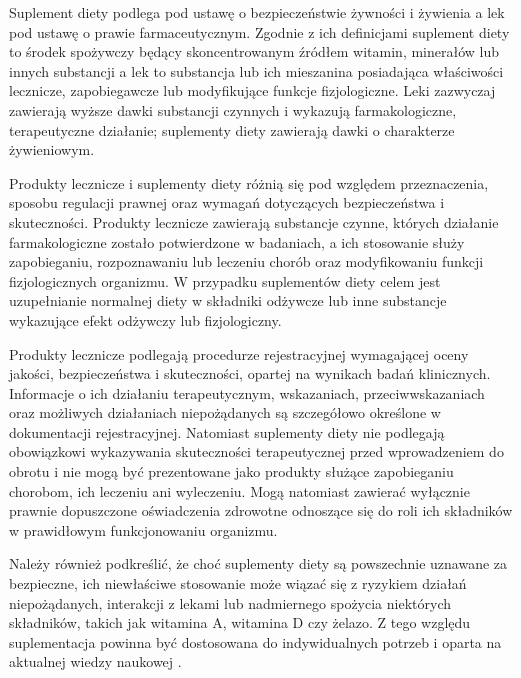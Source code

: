 Suplement diety podlega pod ustawę o bezpieczeństwie żywności i żywienia a lek pod ustawę o prawie farmaceutycznym. Zgodnie z ich definicjami suplement diety to środek spożywczy będący skoncentrowanym źródłem witamin, minerałów lub innych substancji a lek to substancja lub ich mieszanina posiadająca właściwości lecznicze, zapobiegawcze lub modyfikujące funkcje fizjologiczne. Leki zazwyczaj zawierają wyższe dawki substancji czynnych i wykazują farmakologiczne, terapeutyczne działanie; suplementy diety zawierają dawki o charakterze żywieniowym.

Produkty lecznicze i suplementy diety różnią się pod względem przeznaczenia, sposobu regulacji prawnej oraz wymagań dotyczących bezpieczeństwa i skuteczności. Produkty lecznicze zawierają substancje czynne, których działanie farmakologiczne zostało potwierdzone w badaniach, a ich stosowanie służy zapobieganiu, rozpoznawaniu lub leczeniu chorób oraz modyfikowaniu funkcji fizjologicznych organizmu. W przypadku suplementów diety celem jest uzupełnianie normalnej diety w składniki odżywcze lub inne substancje wykazujące efekt odżywczy lub fizjologiczny.

Produkty lecznicze podlegają procedurze rejestracyjnej wymagającej oceny jakości, bezpieczeństwa i skuteczności, opartej na wynikach badań klinicznych. Informacje o ich działaniu terapeutycznym, wskazaniach, przeciwwskazaniach oraz możliwych działaniach niepożądanych są szczegółowo określone w dokumentacji rejestracyjnej. Natomiast suplementy diety nie podlegają obowiązkowi wykazywania skuteczności terapeutycznej przed wprowadzeniem do obrotu i nie mogą być prezentowane jako produkty służące zapobieganiu chorobom, ich leczeniu ani wyleczeniu. Mogą natomiast zawierać wyłącznie prawnie dopuszczone oświadczenia zdrowotne odnoszące się do roli ich składników w prawidłowym funkcjonowaniu organizmu.

Należy również podkreślić, że choć suplementy diety są powszechnie uznawane za bezpieczne, ich niewłaściwe stosowanie może wiązać się z ryzykiem działań niepożądanych, interakcji z lekami lub nadmiernego spożycia niektórych składników, takich jak witamina A, witamina D czy żelazo. Z tego względu suplementacja powinna być dostosowana do indywidualnych potrzeb i oparta na aktualnej wiedzy naukowej \cite{suplementy-a-leki}.



